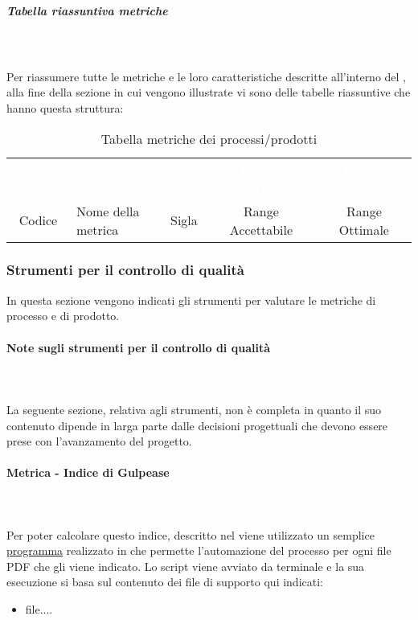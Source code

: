 \subparagraph{Tabella riassuntiva metriche}\mbox{}\\ \\
Per riassumere tutte le metriche e le loro caratteristiche descritte all'interno del \PdQ{}, alla fine della sezione in cui vengono illustrate vi sono delle tabelle riassuntive che hanno questa struttura:
{
\renewcommand{\arraystretch}{1.5}
\begin{longtable}{ c C{4cm} c c c}
\caption{Tabella metriche dei processi/prodotti}\\
\textcolor{white}{\textbf{Metrica}} & \textcolor{white}{\textbf{Nome}} & \textcolor{white}{\textbf{Sigla}} & \textcolor{white}{\textbf{Range Accettabile}} & \textcolor{white}{\textbf{Range Ottimale}}\\
Codice & Nome della metrica & Sigla & Range Accettabile & Range Ottimale \\
\end{longtable}
}

\subsubsection{Strumenti per il controllo di qualità}
In questa sezione vengono indicati gli strumenti per valutare le metriche di processo e di prodotto.
\paragraph*{Note sugli strumenti per il controllo di qualità}\mbox{}\\ \\
La seguente sezione, relativa agli strumenti, non è completa in quanto il suo contenuto dipende in larga parte dalle decisioni progettuali che devono essere prese con l'avanzamento del progetto.
\paragraph{Metrica - Indice di Gulpease}\mbox{}\\ \\
Per poter calcolare questo indice, descritto nel \PdQ{} viene utilizzato un semplice \href{...}{programma} realizzato in  che permette l'automazione del processo per ogni file PDF che gli viene indicato.
Lo script viene avviato da terminale e la sua esecuzione si basa sul contenuto dei file di supporto qui indicati: 
\begin{itemize}
    \item file....
\end{itemize}